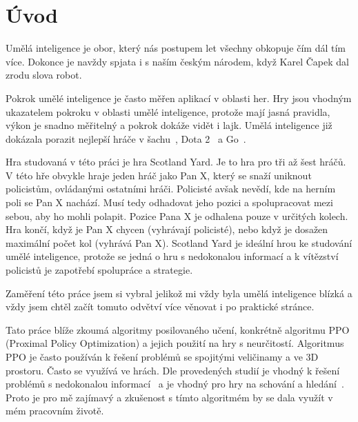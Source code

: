 
%

\newtheorem{definition}{\textbf{Definice}}

\chapter{Úvod}
\label{ch:uvod}

Umělá inteligence je obor, který nás postupem let všechny obkopuje čím dál tím více.
Dokonce je navždy spjata i s naším českým národem, když Karel Čapek dal zrodu slova robot.

Pokrok umělé inteligence je často měřen aplikací v oblasti her.
Hry jsou vhodným ukazatelem pokroku v oblasti umělé inteligence, protože mají jasná pravidla, výkon je snadno měřitelný a pokrok dokáže vidět i lajk.
Umělá inteligence již dokázala porazit nejlepší hráče v šachu~\cite{DeepBlue}, Dota 2~\cite{Dota2} a Go~\cite{AlphaGo}.

Hra studovaná v této práci je hra Scotland Yard.
Je to hra pro tři až šest hráčů.
V této hře obvykle hraje jeden hráč jako Pan X, který se snaží uniknout policistům, ovládanými ostatními hráči.
Policisté avšak nevědí, kde na herním poli se Pan X nachází.
Musí tedy odhadovat jeho pozici a spolupracovat mezi sebou, aby ho mohli polapit.
Pozice Pana X je odhalena pouze v určitých kolech.
Hra končí, když je Pan X chycen (vyhrávají policisté), nebo když je dosažen maximální počet kol (vyhrává Pan X).
Scotland Yard je ideální hrou ke studování umělé inteligence, protože se jedná o hru s nedokonalou informací a k vítězství policistů je zapotřebí spolupráce a strategie.

Zaměření této práce jsem si vybral jelikož mi vždy byla umělá inteligence blízká a vždy jsem chtěl začít tomuto odvětví více věnovat i po praktické stránce.

Tato práce blíže zkoumá algoritmy posilovaného učení, konkrétně algoritmu PPO (Proximal Policy Optimization) a jejich použití na hry s neurčitostí.
Algoritmus PPO je často používán k řešení problémů se spojitými veličinamy a ve 3D prostoru.
Často se využívá ve hrách.
Dle provedených studií je vhodný k řešení problémů s nedokonalou informací~\cite{Manille} a je vhodný pro hry na schování a hledání~\cite{PPO_Hide_Seek}.
Proto je pro mě zajímavý a zkušenost s tímto algoritmém by se dala využít v mém pracovním životě.

